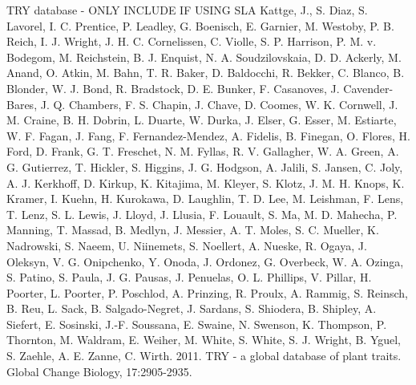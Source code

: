 \documentclass[]{book}
\begin{document}
TRY database - ONLY INCLUDE IF USING SLA
Kattge, J., S. Diaz, S. Lavorel, I. C. Prentice, P. Leadley, G. Boenisch, E. Garnier, M. Westoby, P. B. Reich, I. J. Wright, J. H. C. Cornelissen, C. Violle, S. P. Harrison, P. M. v. Bodegom, M. Reichstein, B. J. Enquist, N. A. Soudzilovskaia, D. D. Ackerly, M. Anand, O. Atkin, M. Bahn, T. R. Baker, D. Baldocchi, R. Bekker, C. Blanco, B. Blonder, W. J. Bond, R. Bradstock, D. E. Bunker, F. Casanoves, J. Cavender-Bares, J. Q. Chambers, F. S. Chapin, J. Chave, D. Coomes, W. K. Cornwell, J. M. Craine, B. H. Dobrin, L. Duarte, W. Durka, J. Elser, G. Esser, M. Estiarte, W. F. Fagan, J. Fang, F. Fernandez-Mendez, A. Fidelis, B. Finegan, O. Flores, H. Ford, D. Frank, G. T. Freschet, N. M. Fyllas, R. V. Gallagher, W. A. Green, A. G. Gutierrez, T. Hickler, S. Higgins, J. G. Hodgson, A. Jalili, S. Jansen, C. Joly, A. J. Kerkhoff, D. Kirkup, K. Kitajima, M. Kleyer, S. Klotz, J. M. H. Knops, K. Kramer, I. Kuehn, H. Kurokawa, D. Laughlin, T. D. Lee, M. Leishman, F. Lens, T. Lenz, S. L. Lewis, J. Lloyd, J. Llusia, F. Louault, S. Ma, M. D. Mahecha, P. Manning, T. Massad, B. Medlyn, J. Messier, A. T. Moles, S. C. Mueller, K. Nadrowski, S. Naeem, U. Niinemets, S. Noellert, A. Nueske, R. Ogaya, J. Oleksyn, V. G. Onipchenko, Y. Onoda, J. Ordonez, G. Overbeck, W. A. Ozinga, S. Patino, S. Paula, J. G. Pausas, J. Penuelas, O. L. Phillips, V. Pillar, H. Poorter, L. Poorter, P. Poschlod, A. Prinzing, R. Proulx, A. Rammig, S. Reinsch, B. Reu, L. Sack, B. Salgado-Negret, J. Sardans, S. Shiodera, B. Shipley, A. Siefert, E. Sosinski, J.-F. Soussana, E. Swaine, N. Swenson, K. Thompson, P. Thornton, M. Waldram, E. Weiher, M. White, S. White, S. J. Wright, B. Yguel, S. Zaehle, A. E. Zanne, C. Wirth. 2011. TRY - a global database of plant traits. Global Change Biology, 17:2905-2935.


\end{document}
